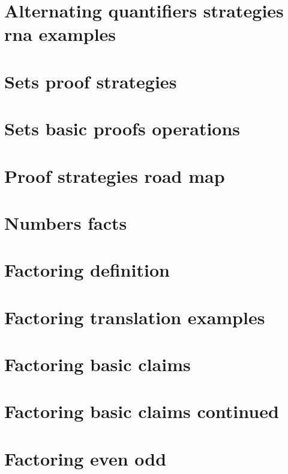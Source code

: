 \section*{Alternating quantifiers strategies rna examples}

\vfill
\section*{Sets proof strategies}

\vfill
\section*{Sets basic proofs operations}

\vfill
\section*{Proof strategies road map}

\vfill
\section*{Numbers facts}

\vfill
\section*{Factoring definition}

\vfill
\section*{Factoring translation examples}

\vfill
\section*{Factoring basic claims}

\vfill
\section*{Factoring basic claims continued}

\vfill
\section*{Factoring even odd}

\vfill

